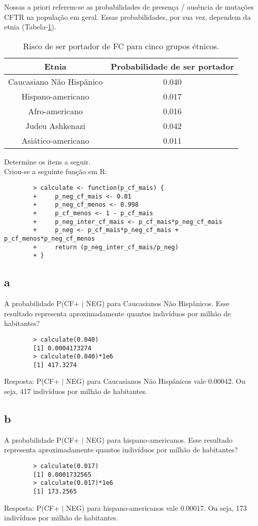 \documentclass{article}[twocolumn]
\begin{document}
	Nossas a priori referem-se as probabilidades de presença / ausência de mutações CFTR na
	população em geral. Essas probabilidades, por sua vez, dependem da etnia
	(Tabela-\ref{tab:priori}).
	\begin{table}[H]
		\centering
		\begin{tabular}{cc}
			\hline
			Etnia & Probabilidade de ser portador\\
			\hline
			Caucasiano Não Hispânico & 0.040\\
			Hispano-americano & 0.017\\
			Afro-americano & 0.016\\
			Judeu Ashkenazi & 0.042\\
			Asiático-americano & 0.011\\
			\hline
		\end{tabular}
		\caption{Risco de ser portador de FC para cinco grupos étnicos.}
		\label{tab:priori}
	\end{table}
	Determine os itens a seguir.\\
	Criou-se a seguinte função em R:
	\begin{verbatim}
		> calculate <- function(p_cf_mais) {
		+     p_neg_cf_mais <- 0.01
		+     p_neg_cf_menos <- 0.998
		+     p_cf_menos <- 1 - p_cf_mais
		+     p_neg_inter_cf_mais <- p_cf_mais*p_neg_cf_mais
		+     p_neg <- p_cf_mais*p_neg_cf_mais + p_cf_menos*p_neg_cf_menos
		+     return (p_neg_inter_cf_mais/p_neg)
		+ }
	\end{verbatim}
	\subsection{a}
	A  probabilidade  P(CF+  $|$  NEG)  para  Caucasianos  Não  Hispânicos.  Esse  resultado
	representa aproximadamente quantos indivíduos por milhão de habitantes?
	\begin{verbatim}
		> calculate(0.040)
		[1] 0.0004173274
		> calculate(0.040)*1e6
		[1] 417.3274
	\end{verbatim}
	Resposta: P(CF+ $|$ NEG) para Caucasianos  Não  Hispânicos vale 0.00042. Ou seja,
	417 indivíduos por milhão de habitantes.
	\subsection{b}
	A  probabilidade  P(CF+  $|$  NEG)  para  hispano-americanos. Esse  resultado
	representa aproximadamente quantos indivíduos por milhão de habitantes?
	\begin{verbatim}
		> calculate(0.017)
		[1] 0.0001732565
		> calculate(0.017)*1e6
		[1] 173.2565
	\end{verbatim}
	Resposta: P(CF+ $|$ NEG) para hispano-americanos vale 0.00017. Ou seja,
	173 indivíduos por milhão de habitantes.
\end{document}
